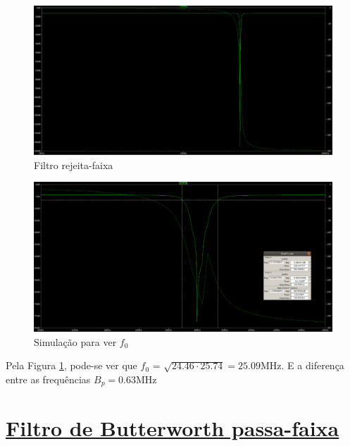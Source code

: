 \documentclass[14pt, oneside]{book}
\theoremstyle{definition}
\begin{document}
            \begin{figure}[H]
                \centering
                \includegraphics[scale=0.4]{rejeitando.jpeg}
                \caption{Filtro rejeita-faixa}
            \end{figure}
            
            \begin{figure}[H]
                \centering
                \includegraphics[scale=0.4]{rejeitamedida.jpeg}
                \caption{Simulação para ver $f_0$}
                \label{here}
            \end{figure}
            
            
            Pela Figura \ref{here}, pode-se ver que $f_0$ = $\sqrt{24.46\cdot 25.74} = 25.09$MHz. E a diferença entre as frequências $B_p = 0.63$MHz
            
            
            
            
            
                    
                
            \chapter[Filtro de Butterworth passa-faixa]{\hyperlink{toc}{Filtro de Butterworth passa-faixa}}
            
\end{document}
